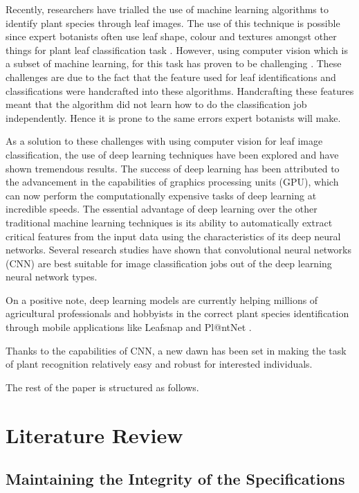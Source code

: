 \documentclass[conference]{IEEEtran}
\begin{document}
Recently, researchers have trialled the use of machine learning algorithms to identify plant species through leaf images. The use of this technique is possible since expert botanists often use leaf shape, colour and textures amongst other things for plant leaf classification task \cite{xiao2010hog, kadir2013leaf}. However, using computer vision which is a subset of machine learning, for this task has proven to be challenging \cite{kamilaris2018deep}. These challenges are due to the fact that the feature used for leaf identifications and classifications were handcrafted into these algorithms. Handcrafting these features meant that the algorithm did not learn how to do the classification job independently. Hence it is prone to the same errors expert botanists will make.

As a solution to these challenges with using computer vision for leaf image classification, the use of deep learning techniques have been explored and have shown tremendous results. The success of deep learning has been attributed to the advancement in the capabilities of graphics processing units (GPU), which can now perform the computationally expensive tasks of deep learning at incredible speeds. The essential advantage of deep learning over the other traditional machine learning techniques is its ability to automatically extract critical features from the input data using the characteristics of its deep neural networks. Several research studies have shown that convolutional neural networks (CNN) are best suitable for image classification jobs out of the deep learning neural network types.

On a positive note, deep learning models are currently helping millions of agricultural professionals and hobbyists in the correct plant species identification through mobile applications like Leafsnap and Pl@ntNet \cite{kumar2012leafsnap, get the one for plantvillage}.

Thanks to the capabilities of CNN, a new dawn has been set in making the task of plant recognition relatively easy and robust for interested individuals.

The rest of the paper is structured as follows.


\section{Literature Review}

\subsection{Maintaining the Integrity of the Specifications}
\end{document}

